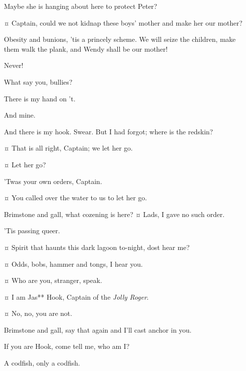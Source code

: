 \begin{drama}
\starkeyspeaks
Maybe she is hanging about here to protect Peter?


\smeespeaks {}¤
Captain, could we not kidnap these boys' mother and make her our mother?

\hookspeaks
Obesity and bunions, 'tis a princely scheme.
We will seize the children, make them walk the plank, and Wendy shall be our mother!

\wendyspeaks
Never!

\hookspeaks
What say you, bullies?

\smeespeaks
There is my hand on 't.

\starkeyspeaks
And mine.

\hookspeaks
And there is my hook.
Swear.
But I had forgot; where is the redskin?

\smeespeaks {}¤
That is all right, Captain; we let her go.

\hookspeaks {}¤
Let her go?

\smeespeaks
'Twas your own orders, Captain.

\starkeyspeaks {}¤
You called over the water to us to let her go.

\hookspeaks
Brimstone and gall, what cozening is here?
¤
Lads, I gave no such order.

\smeespeaks
'Tis passing queer.

\hookspeaks {}¤
Spirit that haunts this dark lagoon to-night, dost hear me?

\peterspeaks {}¤
Odds, bobs, hammer and tongs, I hear you.

\hookspeaks {}¤
Who are you, stranger, speak.

\peterspeaks {}¤
I am Jas** Hook, Captain of the \emph{Jolly Roger}.

\hookspeaks {}¤
No, no, you are not.

\peterspeaks
Brimstone and gall, say that again and I'll cast anchor in you.

\hookspeaks
If you are Hook, come tell me, who am I?

\peterspeaks
A codfish, only a codfish.


\end{drama}
